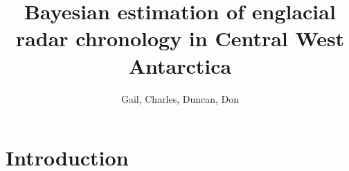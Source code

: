 \documentclass[draft,jgrga]{AGUTeX}
\begin{document}
\title{Bayesian estimation of englacial radar chronology in Central West Antarctica}
\author{Gail, Charles, Duncan, Don}

\begin{abstract}


\end{abstract}
%

\section{Introduction}\label{intro}
	
	
\end{document}

